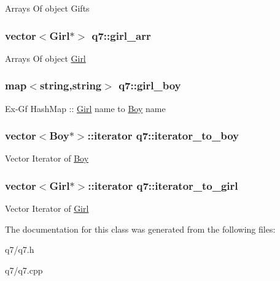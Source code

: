 Arrays Of object Gifts \hypertarget{classq7_a7a0797eb6886b0f63cef660d9d49e942}{
\subsubsection[{girl\-\_\-arr}]{\setlength{\rightskip}{0pt plus 5cm}vector$<${\bf Girl}$\ast$$>$ q7\-::girl\-\_\-arr}}\label{classq7_a7a0797eb6886b0f63cef660d9d49e942}
Arrays Of object \hyperlink{class_girl}{Girl} \hypertarget{classq7_abc1af27d658e8ba3c6b0567b52ed711f}{
\subsubsection[{girl\-\_\-boy}]{\setlength{\rightskip}{0pt plus 5cm}map$<$string,string$>$ q7\-::girl\-\_\-boy}}\label{classq7_abc1af27d658e8ba3c6b0567b52ed711f}
Ex-\/\-Gf Hash\-Map \-:\-: \hyperlink{class_girl}{Girl} name to \hyperlink{class_boy}{Boy} name \hypertarget{classq7_a3474053b58a5d054e8a6762c816d6728}{
\subsubsection[{iterator\-\_\-to\-\_\-boy}]{\setlength{\rightskip}{0pt plus 5cm}vector$<${\bf Boy}$\ast$$>$\-::iterator q7\-::iterator\-\_\-to\-\_\-boy}}\label{classq7_a3474053b58a5d054e8a6762c816d6728}
Vector Iterator of \hyperlink{class_boy}{Boy} \hypertarget{classq7_a09a56f791e165e00017bf472a980bf8d}{
\subsubsection[{iterator\-\_\-to\-\_\-girl}]{\setlength{\rightskip}{0pt plus 5cm}vector$<${\bf Girl}$\ast$$>$\-::iterator q7\-::iterator\-\_\-to\-\_\-girl}}\label{classq7_a09a56f791e165e00017bf472a980bf8d}
Vector Iterator of \hyperlink{class_girl}{Girl} 

The documentation for this class was generated from the following files\-:\begin{DoxyCompactItemize}
\item 
q7/q7.\-h\item 
q7/q7.\-cpp\end{DoxyCompactItemize}
